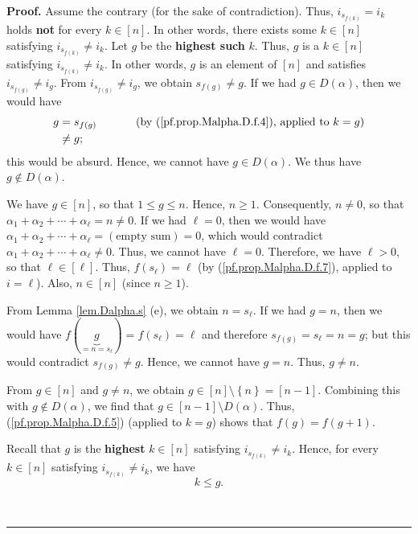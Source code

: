 \documentclass[numbers=enddot,12pt,final,onecolumn,notitlepage,abstracton]{scrartcl}
\theoremstyle{definition}
\newenvironment{proof}[1][Proof]{\noindent\textbf{#1.} }{\ \rule{0.5em}{0.5em}}
\newenvironment{verlong}{}{}
\begin{document}
\begin{verlong}
\begin{footnotesize}
\begin{proof}
Assume the contrary (for the sake of contradiction). Thus, $i_{s_{f\left(
k\right)  }}=i_{k}$ holds \textbf{not} for every $k\in\left[  n\right]  $. In
other words, there exists some $k\in\left[  n\right]  $ satisfying
$i_{s_{f\left(  k\right)  }}\neq i_{k}$. Let $g$ be the \textbf{highest such
}$k$. Thus, $g$ is a $k\in\left[  n\right]  $ satisfying $i_{s_{f\left(
k\right)  }}\neq i_{k}$. In other words, $g$ is an element of $\left[
n\right]  $ and satisfies $i_{s_{f\left(  g\right)  }}\neq i_{g}$. From
$i_{s_{f\left(  g\right)  }}\neq i_{g}$, we obtain $s_{f\left(  g\right)
}\neq g$. If we had $g\in D\left(  \alpha\right)  $, then we would have%
\begin{align*}
g  &  =s_{f\left(  g\right)  }\ \ \ \ \ \ \ \ \ \ \left(  \text{by
(\ref{pf.prop.Malpha.D.f.4}), applied to }k=g\right) \\
&  \neq g;
\end{align*}
this would be absurd. Hence, we cannot have $g\in D\left(  \alpha\right)  $.
We thus have $g\notin D\left(  \alpha\right)  $.

We have $g\in\left[  n\right]  $, so that $1\leq g\leq n$. Hence, $n\geq1$.
Consequently, $n\neq0$, so that $\alpha_{1}+\alpha_{2}+\cdots+\alpha_{\ell
}=n\neq0$. If we had $\ell=0$, then we would have $\alpha_{1}+\alpha
_{2}+\cdots+\alpha_{\ell}=\left(  \text{empty sum}\right)  =0$, which would
contradict $\alpha_{1}+\alpha_{2}+\cdots+\alpha_{\ell}\neq0$. Thus, we cannot
have $\ell=0$. Therefore, we have $\ell>0$, so that $\ell\in\left[
\ell\right]  $. Thus, $f\left(  s_{\ell}\right)  =\ell$ (by
(\ref{pf.prop.Malpha.D.f.7}), applied to $i=\ell$). Also, $n\in\left[
n\right]  $ (since $n\geq1$).

From Lemma \ref{lem.Dalpha.s} (e), we obtain $n=s_{\ell}$. If we had $g=n$,
then we would have $f\left(  \underbrace{g}_{=n=s_{\ell}}\right)  =f\left(
s_{\ell}\right)  =\ell$ and therefore $s_{f\left(  g\right)  }=s_{\ell}=n=g$;
but this would contradict $s_{f\left(  g\right)  }\neq g$. Hence, we cannot
have $g=n$. Thus, $g\neq n$.

From $g\in\left[  n\right]  $ and $g\neq n$, we obtain $g\in\left[  n\right]
\setminus\left\{  n\right\}  =\left[  n-1\right]  $. Combining this with
$g\notin D\left(  \alpha\right)  $, we find that $g\in\left[  n-1\right]
\setminus D\left(  \alpha\right)  $. Thus, (\ref{pf.prop.Malpha.D.f.5})
(applied to $k=g$) shows that $f\left(  g\right)  =f\left(  g+1\right)  $.

Recall that $g$ is the \textbf{highest} $k\in\left[  n\right]  $ satisfying
$i_{s_{f\left(  k\right)  }}\neq i_{k}$. Hence, for every $k\in\left[
n\right]  $ satisfying $i_{s_{f\left(  k\right)  }}\neq i_{k}$, we have%
\begin{equation}
k\leq g. \label{pf.lem.Dalpha.ItoJ.a.1}%
\end{equation}



\end{proof}
\end{footnotesize}
\end{verlong}
\end{document}
